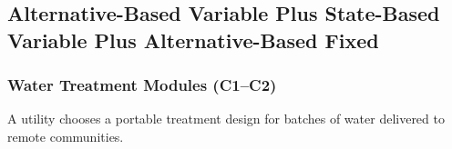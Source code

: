 \subsection{Alternative-Based Variable Plus State-Based Variable Plus Alternative-Based Fixed}
	\label{sec:alternative-based-variable-payoff-plus-state-based-variable-payoff-plus-alternative-based-fixed-payoff}


	\subsubsection{Water Treatment Modules (C1--C2)}
	\label{sec:problem26-water-treatment-modules-c1-c2}
	A utility chooses a portable treatment design for batches of water delivered to remote communities.
